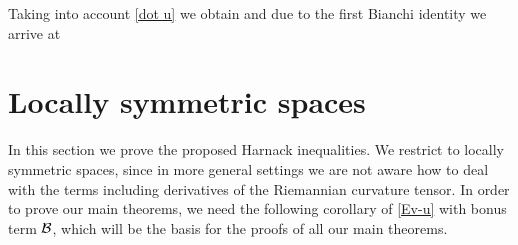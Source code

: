 {Taking into account \eqref{dot u} we obtain
and due to the first Bianchi identity we arrive at

}
\section{Locally symmetric spaces}

In this section we prove the proposed Harnack inequalities. We restrict to locally symmetric spaces, since in more general settings we are not aware how to deal with the terms including derivatives of the Riemannian curvature tensor. In order to prove our main theorems, we need the following corollary of \eqref{Ev-u} with bonus term $\mathcal{B}$, which will be the basis for the proofs of all our main theorems.

